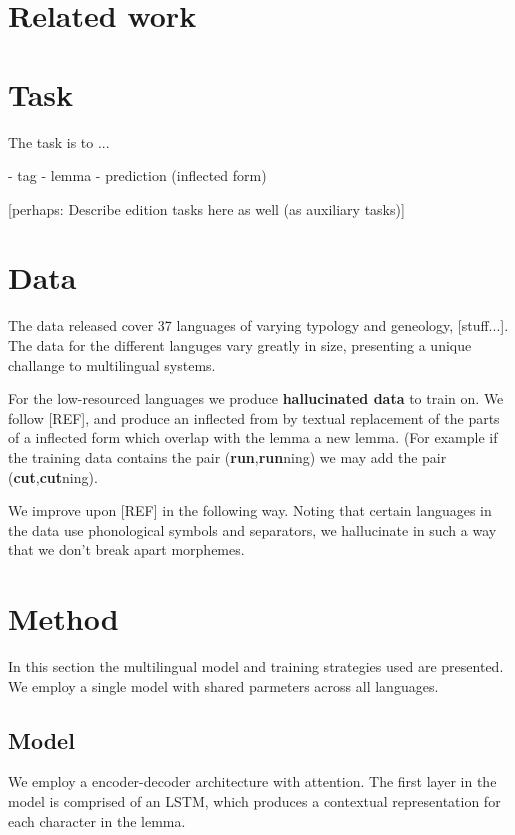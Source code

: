 \documentclass[11pt,a4paper]{article}
\begin{document}
\section{Related work}

\section{Task}

The task is to ... 

- tag
- lemma
- prediction (inflected form)

[perhaps: Describe edition tasks here as well (as auxiliary tasks)]

\section{Data}

The data released cover 37 languages of varying typology and
geneology, [stuff...]. The data for the different languges vary greatly
in size, presenting a unique challange to multilingual systems.

For the low-resourced languages we produce \textbf{hallucinated data}
to train on. We follow [REF], and produce an inflected from by textual
replacement of the parts of a inflected form which overlap with the
lemma a new lemma. (For example if the training data contains the pair
(\textbf{run},\textbf{run}ning) we may add the pair
(\textbf{cut},\textbf{cut}ning).


We improve upon [REF] in the following way.
Noting that certain languages in the data use phonological symbols
and separators, we hallucinate in such a way that we don't break apart
morphemes.


\section{Method}

In this section the multilingual model and training strategies used
are presented. We employ a single model with shared parmeters
across all languages. 

\subsection{Model}

We employ a encoder-decoder architecture with attention. The first
layer in the model is comprised of an LSTM, which produces a
contextual representation for each character in the lemma.
\end{document}
